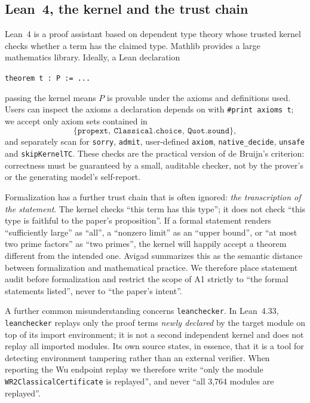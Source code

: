 \documentclass[11pt,a4paper]{article}
\theoremstyle{plain}
\theoremstyle{definition}
\begin{document}
\subsection{Lean~4, the kernel and the trust chain}
\label{sec:lean}

Lean~4 is a proof assistant based on dependent type theory whose trusted kernel checks whether a term has the claimed type\cite{lean4}. Mathlib provides a large mathematics library\cite{mathlib}. Ideally, a Lean declaration
\begin{center}
\texttt{theorem t : P := ...}
\end{center}
passing the kernel means $P$ is provable under the axioms and definitions used. Users can inspect the axioms a declaration depends on with \texttt{\#print axioms t}; we accept only axiom sets contained in
\[
\{\texttt{propext},\ \texttt{Classical.choice},\ \texttt{Quot.sound}\},
\]
and separately scan for \texttt{sorry}, \texttt{admit}, user-defined \texttt{axiom}, \texttt{native\_decide}, \texttt{unsafe} and \texttt{skipKernelTC}. These checks are the practical version of de Bruijn's criterion: correctness must be guaranteed by a small, auditable checker, not by the prover's or the generating model's self-report\cite{geuvers2009}.

Formalization has a further trust chain that is often ignored: \emph{the transcription of the statement}. The kernel checks ``this term has this type''; it does not check ``this type is faithful to the paper's proposition''. If a formal statement renders ``sufficiently large'' as ``all'', a ``nonzero limit'' as an ``upper bound'', or ``at most two prime factors'' as ``two primes'', the kernel will happily accept a theorem different from the intended one. Avigad summarizes this as the semantic distance between formalization and mathematical practice\cite{avigad2018}. We therefore place statement audit before formalization and restrict the scope of A1 strictly to ``the formal statements listed'', never to ``the paper's intent''.

A further common misunderstanding concerns \texttt{leanchecker}. In Lean~4.33, \texttt{leanchecker} replays only the proof terms \emph{newly declared} by the target module on top of its import environment; it is not a second independent kernel and does not replay all imported modules. Its own source states, in essence, that it is a tool for detecting environment tampering rather than an external verifier. When reporting the Wu endpoint replay we therefore write ``only the module \texttt{WR2ClassicalCertificate} is replayed'', and never ``all 3,764 modules are replayed''.
\end{document}
